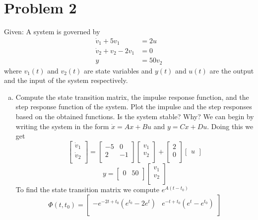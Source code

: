 \documentclass{article}
\begin{document}
\section*{Problem 2}
Given: A system is governed by
\begin{align*}
\dot{v}_1+5v_1 &= 2u \\
\dot{v}_2+v_2 -2v_1 &= 0 \\
y &= 50 v_2
\end{align*}
where $v_1(t)$ and $v_2(t)$ are state variables and $y(t)$ and $u(t)$ are the output and the input of the system respectively.
\begin{enumerate}[(a)]
\item Compute the state transition matrix, the impulse response function, and the step response function of the system.
Plot the impulse and the step responses based on the obtained functions. Is the system stable? Why?
\newline
\newline
We can begin by writing the system in the form $\dot{x} = Ax +Bu$ and $y = Cx + Du$.
Doing this we get
$$
\begin{bmatrix}
\dot{v}_1 \\
\dot{v}_2 \\
\end{bmatrix}
=
\begin{bmatrix}
-5 & 0 \\
2 & -1 \\
\end{bmatrix}
\begin{bmatrix}
v_1 \\
v_2 \\
\end{bmatrix}
+
\begin{bmatrix}
2 \\
0 \\
\end{bmatrix}
\begin{bmatrix}
u
\end{bmatrix}
$$
$$
y =
\begin{bmatrix}
0 & 50 \\
\end{bmatrix}
\begin{bmatrix}
v_1 \\
v_2 \\
\end{bmatrix}
$$
To find the state transition matrix we compute $e^{A (t-t_0)}$
$$
\Phi(t,t_0) =
\begin{bmatrix}
-e^{-2 t + t_0} (e^{t_0}-2 e^t) & e^{-t + t_0} (e^t-e^{t_0}) \\

\end{bmatrix}$$
\end{enumerate}
\end{document}
